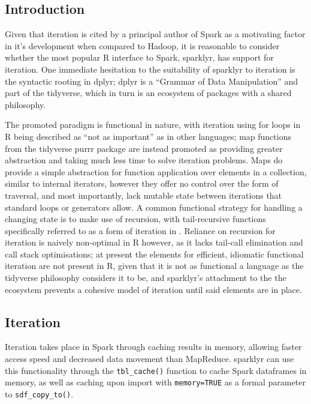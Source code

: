 \hypertarget{introduction}{%
	\subsection{Introduction}\label{sparklyr-introduction}}

Given that iteration is cited by a principal author of Spark as a
motivating factor in it's development when compared to Hadoop, it is
reasonable to consider whether the most popular R interface to Spark,
sparklyr, has support for iteration\cite{zaharia2010spark}\cite{luraschi20}.
One immediate hesitation to the suitability of sparklyr to iteration is
the syntactic rooting in dplyr; dplyr is a ``Grammar of Data
Manipulation'' and part of the tidyverse, which in turn is an ecosystem
of packages with a shared philosophy\cite{wickham2019welcome}\cite{wickham2016r}.

The promoted paradigm is functional in nature, with iteration using for
loops in R being described as ``not as important'' as in other
languages; map functions from the tidyverse purrr package are instead
promoted as providing greater abstraction and taking much less time to
solve iteration problems. Maps do provide a simple abstraction for
function application over elements in a collection, similar to internal
iterators, however they offer no control over the form of traversal, and
most importantly, lack mutable state between iterations that standard
loops or generators allow\cite{cousineau1998functional}. A common
functional strategy for handling a changing state is to make use of
recursion, with tail-recursive functions specifically referred to as a
form of iteration in \cite{abelson1996structure}. Reliance on recursion
for iteration is naively non-optimal in R however, as it lacks tail-call
elimination and call stack optimisations\cite{rcore2020lang}; at present
the elements for efficient, idiomatic functional iteration are not
present in R, given that it is not as functional a language as the
tidyverse philosophy considers it to be, and sparklyr's attachment to
the the ecosystem prevents a cohesive model of iteration until said
elements are in place.

\hypertarget{iteration}{%
	\subsection{Iteration}\label{iteration}}

Iteration takes place in Spark through caching results in memory,
allowing faster access speed and decreased data movement than
MapReduce\cite{zaharia2010spark}. sparklyr can use this functionality
through the \texttt{tbl_cache()} function to
cache Spark dataframes in memory, as well as caching upon import with
\texttt{memory=TRUE} as a formal parameter to
\texttt{sdf_copy_to()}.

